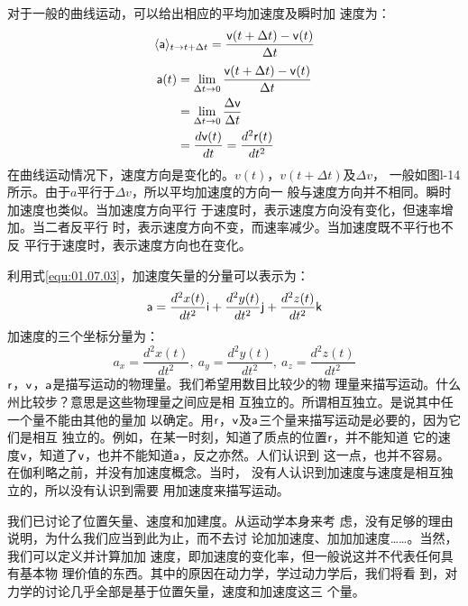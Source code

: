 对于一般的曲线运动，可以给出相应的平均加速度及瞬时加
速度为：
\begin{equation}\label{01.08.02}
    \langle {\sf a} \rangle_{t \rightarrow t+\Delta t} = \frac{{\sf v}(t+\Delta t)-{\sf v}(t)}{\Delta t}
\end{equation}
\begin{equation}\label{01.08.03}
    \begin{aligned}
        {\sf a}(t) &=\lim _{\Delta t \rightarrow 0} \frac{{\sf v}(t+\Delta t)-{\sf v}(t)}{\Delta t} \\
        &=\lim_{\Delta t \rightarrow 0}\frac{\Delta {\sf v}}{\Delta t} \\
        &=\frac{d{\sf v}(t)}{dt}=\frac{d^2 {\sf r}(t)}{d t^2}
    \end{aligned}
\end{equation}
在曲线运动情况下，速度方向是变化的。$v(t)$，$v(t+\Delta t)$及$\Delta v$，
一般如图l-14所示。由于$a$平行于$\Delta v$，所以平均加速度的方向一
般与速度方向并不相同。瞬时加速度也类似。当加速度方向平行
于速度时，表示速度方向没有变化，但速率增加。当二者反平行
时，表示速度方向不变，而速率减少。当加速度既不平行也不反
平行于速度时，表示速度方向也在变化。

利用式\eqref{equ:01.07.03}，加速度矢量的分量可以表示为：
\begin{equation}\label{equ:01.08.04}
    {\sf a}=\frac{d^2x(t)}{dt^2}{\sf i}+\frac{d^2y(t)}{dt^2}{\sf j}+\frac{d^2z(t)}{dt^2}{\sf k}
\end{equation}
加速度的三个坐标分量为：
\begin{equation}\label{equ:01.08.05}
    a_x=\frac{d^2x(t)}{dt^2},~ a_y=\frac{d^2y(t)}{dt^2},~
    a_z=\frac{d^2z(t)}{dt^2}
\end{equation}
${\sf r}$，${\sf v}$，${\sf a}$是描写运动的物理量。我们希望用数目比较少的物
理量来描写运动。什么州比较步？意思是这些物理量之间应是相
互独立的。所谓相互独立。是说其中任一个量不能由其他的量加
以确定。用${\sf r}$，${\sf v}$及${\sf a}$三个量来描写运动是必要的，因为它们是相互
独立的。例如，在某一时刻，知道了质点的位置${\sf r}$，并不能知道
它的速度${\sf v}$，知道了${\sf v}$，也并不能知道${\sf a}$，反之亦然。人们认识到
这一点，也并不容易。在伽利略之前，并没有加速度概念。当时，
没有人认识到加速度与速度是相互独立的，所以没有认识到需要
用加速度来描写运动。

我们已讨论了位置矢量、速度和加建度。从运动学本身来考
虑，没有足够的理由说明，为什么我们应当到此为止，而不去讨
论加加速度、加加加速度……。当然，我们可以定义并计算加加
速度，即加速度的变化率，但一般说这并不代表任何具有基本物
理价值的东西。其中的原因在动力学，学过动力学后，我们将看
到，对力学的讨论几乎全部是基于位置矢量，速度和加速度这三
个量。

